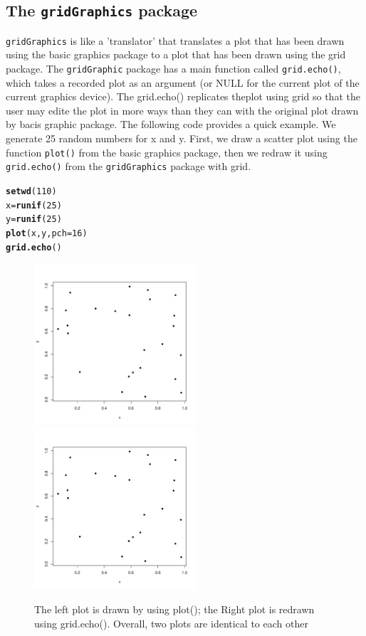 \documentclass[a4paper,10pt]{article}\usepackage[]{graphicx}\usepackage[]{color}
\makeatletter
\newcommand{\hlnum}[1]{\textcolor[rgb]{0.686,0.059,0.569}{#1}}%
\newcommand{\hlstd}[1]{\textcolor[rgb]{0.345,0.345,0.345}{#1}}%
\newcommand{\hlkwb}[1]{\textcolor[rgb]{0.69,0.353,0.396}{#1}}%
\newcommand{\hlkwc}[1]{\textcolor[rgb]{0.333,0.667,0.333}{#1}}%
\newcommand{\hlkwd}[1]{\textcolor[rgb]{0.737,0.353,0.396}{\textbf{#1}}}%
\newenvironment{kframe}{%
 \def\at@end@of@kframe{}%
 \ifinner\ifhmode%
  \def\at@end@of@kframe{\end{minipage}}%
  \begin{minipage}{\columnwidth}%
 \fi\fi%
 \def\FrameCommand##1{\hskip\@totalleftmargin \hskip-\fboxsep
 \colorbox{shadecolor}{##1}\hskip-\fboxsep
     \hskip-\linewidth \hskip-\@totalleftmargin \hskip\columnwidth}%
 \MakeFramed {\advance\hsize-\width
   \@totalleftmargin\z@ \linewidth\hsize
   \@setminipage}}%
 {\par\unskip\endMakeFramed%
 \at@end@of@kframe}
\newenvironment{knitrout}{}{} %
\makeatother
\begin{document}
\subsection{The \texttt{gridGraphics} package}
\texttt{gridGraphics} is like a 'translator' that translates a plot that has been drawn using the basic graphics package to a plot that has been drawn using the grid package. 
The \texttt{gridGraphic} package has a main function called \texttt{grid.echo()}, which takes a recorded plot as an argument (or NULL for the current plot of the current graphics device). The grid.echo() replicates theplot using grid so that the user may edite the plot in more ways than they can with the original plot drawn by bacis graphic package.
The following code provides a quick example. We generate 25 random numbers for x and y. First, we draw a scatter plot using the function \texttt{plot()} from the basic graphics package, then we redraw it using \texttt{grid.echo()} from the \texttt{gridGraphics} package with grid.
\begin{knitrout}
\color{fgcolor}\begin{kframe}
\begin{alltt}
\hlkwd{setwd}\hlstd{(}\hlnum{110}\hlstd{)}
\hlstd{x} \hlkwb{=} \hlkwd{runif}\hlstd{(}\hlnum{25}\hlstd{)}
\hlstd{y} \hlkwb{=} \hlkwd{runif}\hlstd{(}\hlnum{25}\hlstd{)}
\hlkwd{plot}\hlstd{(x,y,} \hlkwc{pch} \hlstd{=} \hlnum{16}\hlstd{)}
\hlkwd{grid.echo}\hlstd{()}
\end{alltt}
\end{kframe}
\end{knitrout}
\begin{figure}[h]
\begin{center}
  \includegraphics[height = 6cm, width = 6cm]{figure/basic.pdf}
  \includegraphics[height = 6cm, width = 6cm]{figure/echo.pdf}
  \caption{The left plot is drawn by using plot(); the Right plot is redrawn using grid.echo(). Overall, two plots are identical to each other}
  	\label{figure1}
\end{center}
\end{figure}
\end{document}
